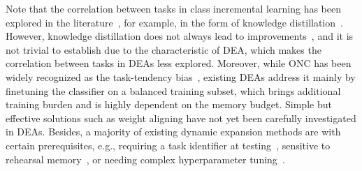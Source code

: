 \documentclass[letterpaper]{article} %
\begin{document}
Note that the correlation between tasks in class incremental learning has been explored in the literature~\cite{v0, t69, t32}, for example, in the form of knowledge distillation~\cite{w20, t54, t19, min2020multi}. However, knowledge distillation does not always lead to improvements~\cite{v0, v25}, and it is not trivial to establish due to the characteristic of DEA, which makes the correlation between tasks in DEAs less explored. Moreover, while ONC has been widely recognized as the task-tendency bias~\cite{v25, t69, d39}, existing DEAs address it mainly by finetuning the classifier on a balanced training subset, which brings additional training burden and is highly dependent on the memory budget. Simple but effective solutions such as weight aligning \cite{d39} have not yet been carefully investigated in DEAs. Besides, a majority of existing dynamic expansion methods are with certain prerequisites, e.g., requiring a task identifier at testing~\cite{t23, t33, t67}, sensitive to rehearsal memory~\cite{t70}, or needing complex hyperparameter tuning~\cite{t70}. 

\end{document}
